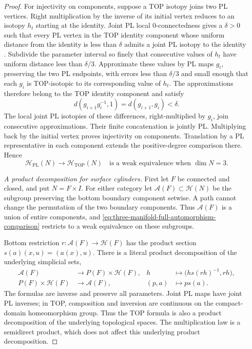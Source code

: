 \begin{proof}
For injectivity on components, suppose a TOP isotopy joins two PL
vertices.  Right multiplication by the inverse of its initial vertex
reduces to an isotopy $h_t$ starting at the identity.  Joint PL local
$0$-connectedness gives a $\delta>0$ such that every PL vertex in the
TOP identity component whose uniform distance from the identity is
less than $\delta$ admits a joint PL isotopy to the identity
\cite[Theorem~2.3.1, p.~224, with \S2.1]{Hamstrom1974}.
Subdivide the parameter interval so finely that consecutive values
of $h_t$ have uniform distance less than $\delta/3$.  Approximate
these values by PL maps $g_i$, preserving the two PL endpoints,
with errors less than $\delta/3$ and small enough that each $g_i$
is TOP-isotopic to its corresponding value of $h_t$.  The approximations
therefore belong to the TOP identity component and satisfy
\[
 d(g_{i+1}g_i^{-1},1)=d(g_{i+1},g_i)<\delta.
\]
The local joint PL isotopies of these differences, right-multiplied
by $g_i$, join consecutive approximations.  Their finite concatenation
is jointly PL.  Multiplying back by the initial vertex proves
injectivity on components.  Translation by a PL representative in
each component extends the positive-degree comparison there.  Hence
\begin{equation}\label{eq:three-manifold-full-automorphism-comparison}
 \mathcal H_{\mathrm{PL}}(N)\longrightarrow
 \mathcal H_{\mathrm{TOP}}(N)
 \quad\text{is a weak equivalence when }\dim N=3.
\end{equation}

\medskip\noindent\textit{A product decomposition for surface cylinders.}
First let $F$ be connected and closed, and put $N=F\times I$.
For either category let $\mathcal A(F)\subset\mathcal H(N)$ be the
subgroup preserving the bottom boundary component setwise.  A path
cannot change the permutation of the two boundary components.
Thus $\mathcal A(F)$ is a union of entire components, and
\eqref{eq:three-manifold-full-automorphism-comparison} restricts to
a weak equivalence on these subgroups.

Bottom restriction $r:\mathcal A(F)\to\mathcal H(F)$ has the
product section $s(a)(x,u)=(a(x),u)$.  There is a literal product
decomposition of the underlying simplicial sets,
\begin{equation}\label{eq:bottom-setwise-product-decomposition}
 \begin{aligned}
 \mathcal A(F)&\longrightarrow P(F)\times\mathcal H(F),&
 h&\longmapsto\bigl(hs(rh)^{-1},rh\bigr),\\
 P(F)\times\mathcal H(F)&\longrightarrow\mathcal A(F),&
 (p,a)&\longmapsto ps(a).
 \end{aligned}
\end{equation}
The formulas are inverse and preserve all parameters.  Joint PL
maps have joint PL inverses; in TOP, composition and inversion are
continuous on the compact-domain homeomorphism group.  Thus the TOP
formula is also a product decomposition of the underlying topological
spaces.  The multiplication law is a semidirect product, which does
not affect this underlying product decomposition.


\end{proof}
